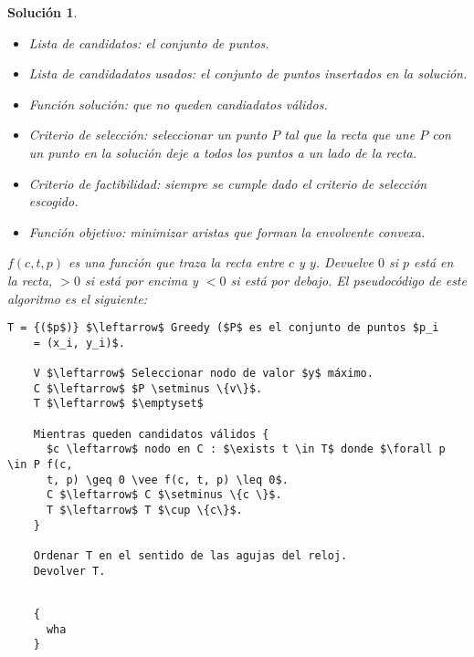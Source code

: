 \documentclass[11pt, a4paper]{article}
\newif\IfInSansMode
\theoremstyle{theorem-style}
\theoremstyle{definition-style}
\theoremstyle{remark-style}
\newtheorem*{sol}{Solución}
\theoremstyle{example-style}
\begin{document}
\begin{sol}
  \begin{itemize}
  \item Lista de candidatos: el conjunto de puntos.
  \item Lista de candidadatos usados: el conjunto de puntos insertados en la
    solución.
  \item Función solución: que no queden candiadatos válidos.
  \item Criterio de selección: seleccionar un punto $P$ tal que la recta que une
    $P$ con un punto en la solución deje a todos los puntos a un lado de la
    recta.
  \item Criterio de factibilidad: siempre se cumple dado el criterio de
    selección escogido.
  \item Función objetivo: minimizar aristas que forman la \textit{envolvente convexa}.
  \end{itemize}

  $f(c, t, p)$ es una función que traza la recta entre $c$ y $y$. Devuelve $0$ si
  $p$ está en la recta, $> 0$ si está por encima y $< 0$ si está por debajo. El
  pseudocódigo de este algoritmo es el siguiente:

  \begin{lstlisting}[mathescape=true]
    T = {($p$)} $\leftarrow$ Greedy ($P$ es el conjunto de puntos $p_i
    = (x_i, y_i)$.

    V $\leftarrow$ Seleccionar nodo de valor $y$ máximo.
    C $\leftarrow$ $P \setminus \{v\}$.
    T $\leftarrow$ $\emptyset$

    Mientras queden candidatos válidos {
      $c \leftarrow$ nodo en C : $\exists t \in T$ donde $\forall p \in P f(c,
      t, p) \geq 0 \vee f(c, t, p) \leq 0$.
      C $\leftarrow$ C $\setminus \{c \}$.
      T $\leftarrow$ T $\cup \{c\}$.
    }

    Ordenar T en el sentido de las agujas del reloj.
    Devolver T.
    
  \end{lstlisting}

  \begin{lstlisting}
    {
      wha
    }
  \end{lstlisting}
  
\end{sol}
\end{document}
